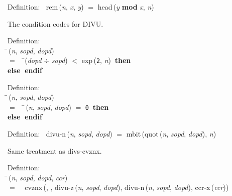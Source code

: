 \begin{tabbing}{\sc Definition}:$\;\;$
{\rm{rem}}\,({\it{n\/}}, {\it{x\/}}, {\it{y\/}}) $=$ {\rm{head}}\,({\it{y\/}} ${}${\bf{mod}}${}$ {\it{x\/}}, {\it{n\/}})
\end{tabbing}

 The condition codes for DIVU.
\begin{tabbing}{\sc Definition}: \\  
\=\,({\it{n\/}}, {\it{sopd\/}}, {\it{dopd\/}}) \\ 
$=$$\;\;\;\;$\=({\it{dopd\/}} $\div$ {\it{sopd\/}}) $<$ {\rm{exp}}\,({\tt{2}}, {\it{n\/}})$\;\;${\bf then }{} \\ 
{\bf else }{}$\;${\bf  endif}\-\-
\end{tabbing}

\begin{tabbing}{\sc Definition}: \\  
\=\,({\it{n\/}}, {\it{sopd\/}}, {\it{dopd\/}}) \\ 
$=$$\;\;\;\;$\=\,({\it{n\/}}, {\it{sopd\/}}, {\it{dopd\/}}) $=$ {\tt{0}}$\;\;${\bf then }{} \\ 
{\bf else }{}$\;${\bf  endif}\-\-
\end{tabbing}

\begin{tabbing}{\sc Definition}:$\;\;$
{\rm{divu-n}}\,({\it{n\/}}, {\it{sopd\/}}, {\it{dopd\/}}) $=$ {\rm{mbit}}\,({\rm{quot}}\,({\it{n\/}}, {\it{sopd\/}}, {\it{dopd\/}}), {\it{n\/}})
\end{tabbing}

 Same treatment as divs-cvznx.
\begin{tabbing}{\sc Definition}: \\  
\=\,({\it{n\/}}, {\it{sopd\/}}, {\it{dopd\/}}, {\it{ccr\/}}) \\ 
$=$$\;\;\;\;${\rm{cvznx}}\,({}, {}, {\rm{divu-z}}\,({\it{n\/}}, {\it{sopd\/}}, {\it{dopd\/}}), {\rm{divu-n}}\,({\it{n\/}}, {\it{sopd\/}}, {\it{dopd\/}}), {\rm{ccr-x}}\,({\it{ccr\/}}))\-
\end{tabbing}

